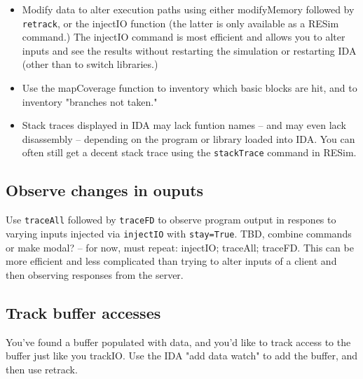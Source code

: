 \documentclass[titlepage]{article}
\begin{document}
\begin{itemize}
\item Modify data to alter execution paths using either modifyMemory followed by {\tt retrack}, or the injectIO function (the latter
is only available as a RESim command.)  The injectIO command is most efficient and allows you to alter inputs and see
the results without restarting the simulation or restarting IDA (other than to switch libraries.)

\item Use the mapCoverage function to inventory which basic blocks are hit, and to inventory "branches not taken."

\item Stack traces displayed in IDA may lack funtion names -- and may even lack disassembly -- depending on the program or
library loaded into IDA.  You can often still get a decent stack trace using the {\tt stackTrace} command in RESim.

\end{itemize}

\subsection{Observe changes in ouputs}
Use {\tt traceAll} followed by {\tt traceFD} to observe program output in respones to varying inputs injected
via {\tt injectIO} with {\tt stay=True}. TBD, combine commands or make modal? -- for now, must repeat: injectIO;
traceAll; traceFD.  This can be more efficient and less complicated than trying to alter inputs of a client and then
observing responses from the server. 

\subsection{Track buffer accesses}
You've found a buffer populated with data, and you'd like to track access to the buffer just
like you trackIO.  Use the IDA "add data watch" to add the buffer, and then use retrack.
\end{document}
